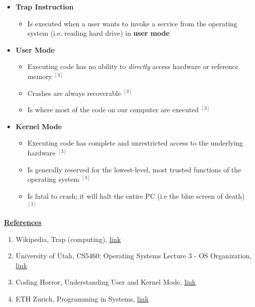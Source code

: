 \documentclass[12pt]{article}
\begin{document}
\begin{enumerate}[1.]
\begin{enumerate}[a)]
\begin{itemize}
            \item \textbf{Trap Instruction}

            \begin{itemize}
                \item Is executed when a user wants to invoke a service from the operating system (i.e. reading hard drive)
                in \textbf{user mode}
            \end{itemize}

            \item \textbf{User Mode}

            \begin{itemize}
                \item Executing code has no ability to \textit{directly} access
                hardware or reference memory $^{[3]}$
                \item Crashes are always recoverable $^{[3]}$
                \item Is where most of the code on our computer are executed $^{[3]}$
            \end{itemize}

            \item \textbf{Kernel Mode}
            \begin{itemize}
                \item Executing code has complete and unrestricted access to the underlying hardware $^{[3]}$
                \item Is generally reserved for the lowest-level, most trusted functions of the operating
                system $^{[3]}$
                \item Is fatal to crash; it will halt the entire PC (i.e the blue screen of death) $^{[3]}$
            \end{itemize}
        \end{itemize}

        \bigskip

        \underline{\textbf{References}}

        \begin{enumerate}[1)]
            \item Wikipedia, Trap (computing), \href{https://en.wikipedia.org/wiki/Trap_(computing)#:~:text=In%20computing%20and%20operating%20systems,zero%2C%20invalid%20memory%20access).}{link}
            \item University of Utah, CS5460: Operating Systems Lecture 3 - OS Organization, \href{https://my.eng.utah.edu/~cs5460/slides/Lecture03.pdf}{link}
            \item Coding Horror, Understanding User and Kernel Mode, \href{https://blog.codinghorror.com/understanding-user-and-kernel-mode/}{link}
            \item ETH Zurich, Programming in Systems, \href{link}{link}
        \end{enumerate}


\end{enumerate}
\end{enumerate}
\end{document}
